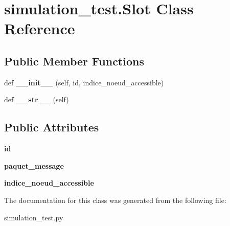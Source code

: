 \hypertarget{classsimulation__test_1_1Slot}{}\section{simulation\+\_\+test.\+Slot Class Reference}
\label{classsimulation__test_1_1Slot}
\subsection*{Public Member Functions}
\begin{DoxyCompactItemize}
\item 
def {\bfseries \+\_\+\+\_\+init\+\_\+\+\_\+} (self, id, indice\+\_\+noeud\+\_\+accessible)\hypertarget{classsimulation__test_1_1Slot_a2c2ab08a76a1dc0f95d1ed92ab7b6b0c}{}\label{classsimulation__test_1_1Slot_a2c2ab08a76a1dc0f95d1ed92ab7b6b0c}

\item 
def {\bfseries \+\_\+\+\_\+str\+\_\+\+\_\+} (self)\hypertarget{classsimulation__test_1_1Slot_aa4508fadec347b5059e6ade062a4fa8d}{}\label{classsimulation__test_1_1Slot_aa4508fadec347b5059e6ade062a4fa8d}

\end{DoxyCompactItemize}
\subsection*{Public Attributes}
\begin{DoxyCompactItemize}
\item 
{\bfseries id}\hypertarget{classsimulation__test_1_1Slot_a030929ce9a1bdf42267ff090565810aa}{}\label{classsimulation__test_1_1Slot_a030929ce9a1bdf42267ff090565810aa}

\item 
{\bfseries paquet\+\_\+message}\hypertarget{classsimulation__test_1_1Slot_a53adaf01b26f3a1dcea5295379dcd728}{}\label{classsimulation__test_1_1Slot_a53adaf01b26f3a1dcea5295379dcd728}

\item 
{\bfseries indice\+\_\+noeud\+\_\+accessible}\hypertarget{classsimulation__test_1_1Slot_a111082b970803f1a7fb9bfcef19185d3}{}\label{classsimulation__test_1_1Slot_a111082b970803f1a7fb9bfcef19185d3}

\end{DoxyCompactItemize}


The documentation for this class was generated from the following file\+:\begin{DoxyCompactItemize}
\item 
simulation\+\_\+test.\+py\end{DoxyCompactItemize}
